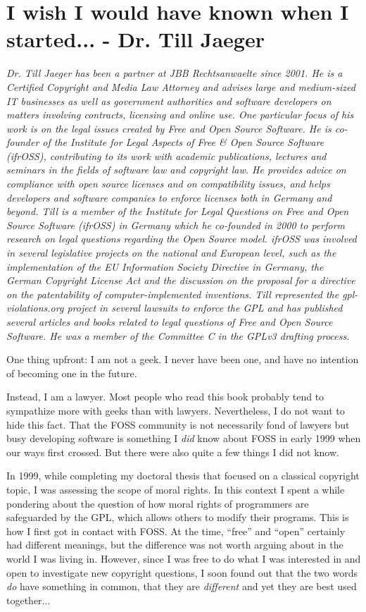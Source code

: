 \chapter{I wish I would have known when I started... - Dr. Till Jaeger} 

\textit{Dr. Till Jaeger has been a partner at JBB Rechtsanwaelte since 2001. He
is a Certified Copyright and Media Law Attorney and advises large and
medium-sized IT businesses as well as government authorities and software
developers on matters involving contracts, licensing and online use. One
particular focus of his work is on the legal issues created by Free and Open
Source Software. He is co-founder of the Institute for Legal Aspects of Free \&
Open Source Software (ifrOSS), contributing to its work with academic
publications, lectures and seminars in the fields of software law and copyright
law. He provides advice on compliance with open source licenses and on
compatibility issues, and helps developers and software companies to enforce
licenses both in Germany and beyond.
\newline
Till is a member of the Institute for Legal Questions on Free and Open Source
Software (ifrOSS) in Germany which he co-founded in 2000 to perform research on
legal questions regarding the Open Source model. ifrOSS was involved in several
legislative projects on the national and European level, such as the
implementation of the EU Information Society Directive in Germany, the German
Copyright License Act and the discussion on the proposal for a directive on the
patentability of computer-implemented inventions.
\newline
Till represented the gpl-violations.org project in several lawsuits to enforce
the GPL and has published several articles and books related to legal questions
of Free and Open Source Software. He was a member of the Committee C in the
GPLv3 drafting process.}

One thing upfront: I am not a geek. I never have been one, and have no intention
of becoming one in the future. 

Instead, I am a lawyer. Most people who read this book probably tend to
sympathize more with geeks than with lawyers. Nevertheless, I do not want to
hide this fact. That the FOSS community is not necessarily fond of lawyers but
busy developing software is something I \textit{did} know about FOSS in early
1999 when our ways first crossed. But there were also quite a few things I did
not know.

In 1999, while completing my doctoral thesis that focused on a classical
copyright topic, I was assessing the scope of moral rights. In this context I
spent a while pondering about the question of how moral rights of programmers
are safeguarded by the GPL, which allows others to modify their programs. This
is how I first got in contact with FOSS. At the time, ``free'' and ``open''
certainly had different meanings, but the difference was not worth arguing
about in the world I was living in. However, since I was free to do what I was
interested in and open to investigate new copyright questions, I soon found out
that the two words \textit{do} have something in common, that they are
\textit{different} and yet they are best used together...

